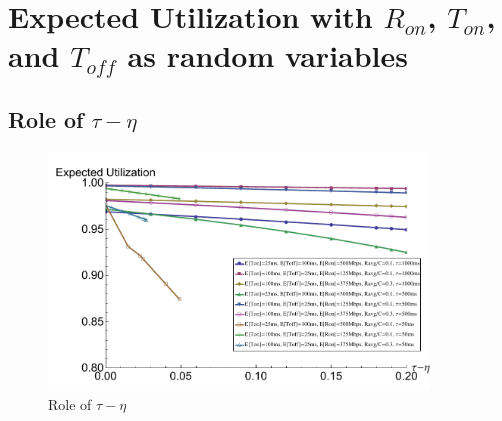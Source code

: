 \section{Expected Utilization with $R_{on}$, $T_{on}$, and $T_{off}$ as 
random variables}

  \subsection{Role of $\tau - \eta$}
    \begin{figure}[h]
      \centering
      \includegraphics[width=0.9\textwidth]{img/taueta.pdf}
      \caption{Role of $\tau - \eta$}
      \label{taueta}
    \end{figure}
